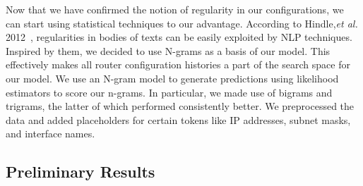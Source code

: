Now that we have confirmed the notion of regularity in our configurations, we can start using statistical techniques to our advantage. According to Hindle,\textit{et al.} 2012~\cite{naturalness}, regularities in bodies of texts can be easily exploited by NLP techniques. Inspired by them, we decided to use N-grams as a basis of our model. This effectively makes all router configuration histories a part of the search space for our model. We use an N-gram model to generate predictions using likelihood estimators to score our n-grams. In particular, we made use of bigrams and trigrams, the latter of which performed consistently better. We preprocessed the data and added placeholders for certain tokens like IP addresses, subnet masks, and interface names.

\subsection{Preliminary Results}


